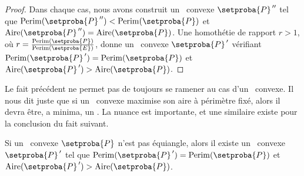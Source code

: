 \begin{proof}
	Dans chaque cas, nous avons construit un \ngone\ convexe $\dbleprimeit{\setproba{P}}$ tel que
	$\perim{\dbleprimeit{\setproba{P}}} < \perim{\setproba{P}}$
	et
	$\area{\dbleprimeit{\setproba{P}}} = \area{\setproba{P}}$.
	Une homothétie de rapport $r > 1$, où $r = \frac{ \perim{\setproba{P}} }{ \perim{\setproba{E}} }$, donne un \ngone\ convexe $\primeit{\setproba{P}}$ vérifiant
	$\perim{\primeit{\setproba{P}}} = \perim{\setproba{P}}$
	et
	$\area{\primeit{\setproba{P}}} > \area{\setproba{P}}$.
\end{proof}


\begin{remark}
	Le fait précédent ne permet pas de toujours se ramener au cas d'un \nequi\ convexe. Il nous dit juste que si un \ngone\ convexe maximise son aire à périmètre fixé, alors il devra être, a minima, un \nequi. La nuance est importante, et une similaire existe pour la conclusion du fait suivant.
\end{remark}




\begin{fact} \label{must-be-iso}
	Si un \nequi\ convexe $\setproba{P}$ n'est pas équiangle,
	alors il existe un \ngone\ convexe $\primeit{\setproba{P}}$ tel que
	$\perim{\primeit{\setproba{P}}} = \perim{\setproba{P}}$
	et
	$\area{\primeit{\setproba{P}}} > \area{\setproba{P}}$.
\end{fact}


